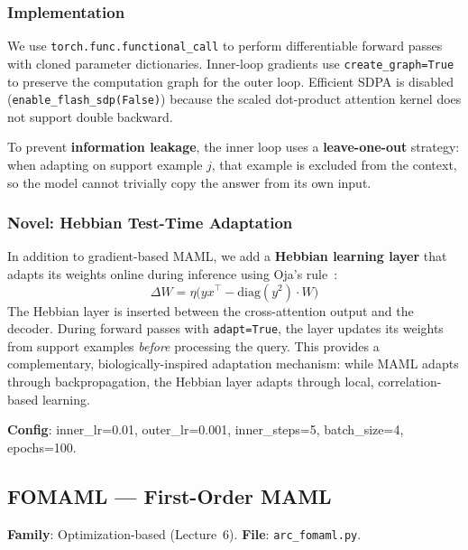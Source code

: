 \documentclass[11pt,a4paper]{article}
\begin{document}
\subsubsection{Implementation}
We use \texttt{torch.func.functional\_call} to perform differentiable forward passes with cloned parameter dictionaries. Inner-loop gradients use \texttt{create\_graph=True} to preserve the computation graph for the outer loop. Efficient SDPA is disabled (\texttt{enable\_flash\_sdp(False)}) because the scaled dot-product attention kernel does not support double backward.

To prevent \textbf{information leakage}, the inner loop uses a \textbf{leave-one-out} strategy: when adapting on support example $j$, that example is excluded from the context, so the model cannot trivially copy the answer from its own input.

\subsubsection{Novel: Hebbian Test-Time Adaptation}
In addition to gradient-based MAML, we add a \textbf{Hebbian learning layer} that adapts its weights online during inference using Oja's rule~\cite{oja1982}:
\begin{equation}
  \Delta W = \eta\bigl(yx^\top - \text{diag}(y^2) \cdot W\bigr)
\end{equation}
The Hebbian layer is inserted between the cross-attention output and the decoder. During forward passes with \texttt{adapt=True}, the layer updates its weights from support examples \emph{before} processing the query. This provides a complementary, biologically-inspired adaptation mechanism: while MAML adapts through backpropagation, the Hebbian layer adapts through local, correlation-based learning.

\textbf{Config}: inner\_lr=0.01, outer\_lr=0.001, inner\_steps=5, batch\_size=4, epochs=100.

\subsection{FOMAML --- First-Order MAML~\cite{finn2017}}
\textbf{Family}: Optimization-based (Lecture~6). \textbf{File}: \texttt{arc\_fomaml.py}.
\end{document}
